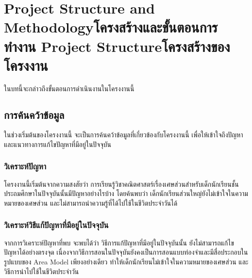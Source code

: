 \chapter{\ifproject%
\ifenglish Project Structure and Methodology\else โครงสร้างและขั้นตอนการทำงาน\fi
\else%
\ifenglish Project Structure\else โครงสร้างของโครงงาน\fi
\fi
}

ในบทนี้จะกล่าวถึงขั้นตอนการดำเนินงานในโครงงานนี้

\makeatletter


\makeatother

\section{การค้นคว้าข้อมูล}
ในช่วงเริ่มต้นของโครงงานนี้ จะเป็นการค้นคว้าข้อมูลที่เกี่ยวข้องกับโครงงานนี้ เพื่อให้เข้าใจถึงปัญหาและแนวทางการแก้ไขปัญหาที่มีอยู่ในปัจจุบัน

\subsection{วิเคราะห์ปัญหา}
โครงงานนี้เริ่มต้นจากความสงสัยว่า การเรียนรู้วิชาคณิตศาสตร์เรื่องเศษส่วนสำหรับเด็กนักเรียนชั้นประถมศึกษาในปัจจุบันนั้นมีปัญหาอย่างไรบ้าง
 โดยค้นพบว่า เด็กนักเรียนส่วนใหญ่ยังไม่เข้าใจในความหมายของเศษส่วน และไม่สามารถนำความรู้ที่ได้ไปใช้ในชีวิตประจำวันได้

\subsection{วิเคราะห์วิธีแก้ปัญหาที่มีอยู่ในปัจจุบัน}
จากการวิเคราะห์ปัญหาที่พบ จะพบได้ว่า วิธีการแก้ปัญหาที่มีอยู่ในปัจจุบันนั้น ยังไม่สามารถแก้ไขปัญหาได้อย่างตรงจุด
 เนื่องจากวิธีการสอนในปัจจุบันยังคงเป็นการสอนแบบท่องจำและมีสื่อประกอบในรูปแบบของ Area Model เพียงอย่างเดียว
 ทำให้เด็กนักเรียนไม่เข้าใจในความหมายของเศษส่วน และวิธีการนำไปใช้ในชีวิตประจำวัน
 
